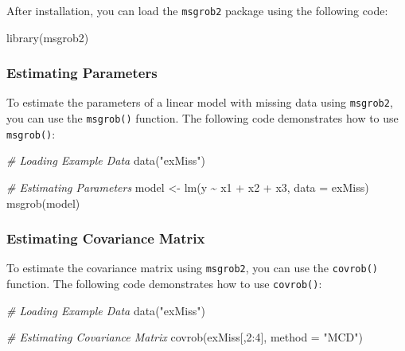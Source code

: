 \documentclass[
]{book}
\newenvironment{Shaded}{\begin{snugshade}}{\end{snugshade}}
\newcommand{\AttributeTok}[1]{\textcolor[rgb]{0.77,0.63,0.00}{#1}}
\newcommand{\CommentTok}[1]{\textcolor[rgb]{0.56,0.35,0.01}{\textit{#1}}}
\newcommand{\DecValTok}[1]{\textcolor[rgb]{0.00,0.00,0.81}{#1}}
\newcommand{\FunctionTok}[1]{\textcolor[rgb]{0.00,0.00,0.00}{#1}}
\newcommand{\NormalTok}[1]{#1}
\newcommand{\OtherTok}[1]{\textcolor[rgb]{0.56,0.35,0.01}{#1}}
\newcommand{\SpecialCharTok}[1]{\textcolor[rgb]{0.00,0.00,0.00}{#1}}
\newcommand{\StringTok}[1]{\textcolor[rgb]{0.31,0.60,0.02}{#1}}
\begin{document}
After installation, you can load the \texttt{msgrob2} package using the following code:

\begin{Shaded}
\begin{Highlighting}[]
\FunctionTok{library}\NormalTok{(msgrob2)}
\end{Highlighting}
\end{Shaded}

\hypertarget{estimating-parameters}{%
\subsubsection{Estimating Parameters}\label{estimating-parameters}}

To estimate the parameters of a linear model with missing data using \texttt{msgrob2}, you can use the \texttt{msgrob()} function. The following code demonstrates how to use \texttt{msgrob()}:

\begin{Shaded}
\begin{Highlighting}[]
\CommentTok{\# Loading Example Data}
\FunctionTok{data}\NormalTok{(}\StringTok{"exMiss"}\NormalTok{)}

\CommentTok{\# Estimating Parameters}
\NormalTok{model }\OtherTok{\textless{}{-}} \FunctionTok{lm}\NormalTok{(y }\SpecialCharTok{\textasciitilde{}}\NormalTok{ x1 }\SpecialCharTok{+}\NormalTok{ x2 }\SpecialCharTok{+}\NormalTok{ x3, }\AttributeTok{data =}\NormalTok{ exMiss)}
\FunctionTok{msgrob}\NormalTok{(model)}
\end{Highlighting}
\end{Shaded}

\hypertarget{estimating-covariance-matrix}{%
\subsubsection{Estimating Covariance Matrix}\label{estimating-covariance-matrix}}

To estimate the covariance matrix using \texttt{msgrob2}, you can use the \texttt{covrob()} function. The following code demonstrates how to use \texttt{covrob()}:

\begin{Shaded}
\begin{Highlighting}[]
\CommentTok{\# Loading Example Data}
\FunctionTok{data}\NormalTok{(}\StringTok{"exMiss"}\NormalTok{)}

\CommentTok{\# Estimating Covariance Matrix}
\FunctionTok{covrob}\NormalTok{(exMiss[,}\DecValTok{2}\SpecialCharTok{:}\DecValTok{4}\NormalTok{], }\AttributeTok{method =} \StringTok{"MCD"}\NormalTok{)}
\end{Highlighting}
\end{Shaded}
\end{document}
